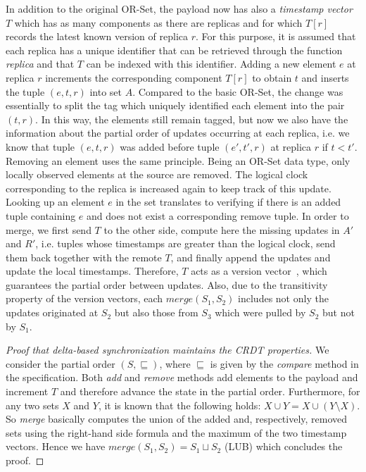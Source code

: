 In addition to the original OR-Set, the payload now has also a \textit{timestamp
vector} $T$ which has as many components as there are replicas and for which
$T[r]$ records the latest known version of replica $r$. For this purpose, it is
assumed that each replica has a unique identifier that can be retrieved through
the function \textit{replica} and that $T$ can be indexed with this identifier.
Adding a new element $e$ at replica $r$ increments the corresponding component
$T[r]$ to obtain $t$ and inserts the tuple $(e, t, r)$ into set $A$. Compared to
the basic OR-Set, the change was essentially to split the tag which uniquely
identified each element into the pair $(t, r)$. In this way, the elements still
remain tagged, but now we also have the information about the partial order of
updates occurring at each replica, i.e. we know that tuple $(e, t, r)$ was added
before tuple $(e', t', r)$ at replica $r$ if $t < t'$. Removing an element uses
the same principle. Being an OR-Set data type, only locally observed elements at
the source are removed. The logical clock corresponding to the replica is
increased again to keep track of this update. Looking up an element $e$ in the
set translates to verifying if there is an added tuple containing $e$ and does
not exist a corresponding remove tuple. In order to merge, we first send $T$ to
the other side, compute here the missing updates in $A'$ and $R'$, i.e. tuples
whose timestamps are greater than the logical clock, send them back together
with the remote $T$, and finally append the updates and update the local
timestamps. Therefore, $T$ acts as a version
vector~\cite{Parker:1983:DMI:1313337.1313753}, which guarantees the partial
order between updates. Also, due to the transitivity property of the version
vectors, each $\textit{merge}(S_{1}, S_{2})$ includes not only the updates
originated at $S_{2}$ but also those from $S_{3}$ which were pulled by $S_{2}$
but not by $S_{1}$.

\begin{proof}[Proof that delta-based synchronization maintains the CRDT
properties] 
We consider the partial order $(S, \sqsubseteq)$, where $\sqsubseteq$ is given
by the \textit{compare} method in the specification. Both \textit{add} and
\textit{remove} methods add elements to the payload and increment $T$ and
therefore advance the state in the partial order. Furthermore, for any two sets
$X$ and $Y$, it is known that the following holds: $X \cup Y = X \cup (Y
\setminus X)$. So \textit{merge} basically computes the union of the added and,
respectively, removed sets using the right-hand side formula and the maximum of
the two timestamp vectors. Hence we have $\textit{merge}(S_{1}, S_{2}) = S_{1}
\sqcup S_{2}$ (LUB) which concludes the proof.
\end{proof}